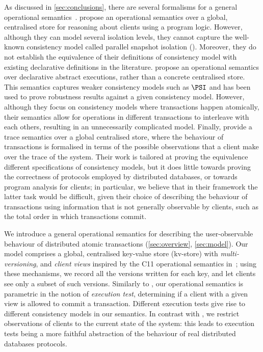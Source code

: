 As discussed in \cref{sec:conclusions}, there are several formalisms for a general operational semantics~\cite{sureshConcur,alonetogether,seebelieve}. 
\citeauthor{alonetogether} \cite{alonetogether} propose an operational
semantics over a global, centralised store  for reasoning about clients using a program logic. 
However, although they can model several isolation levels, they cannot
capture the well-known consistency model called 
parallel snapshot isolation (\PSI). 
Moreover, they do not establish the equivalence of their definitions
of consistency model
with existing declarative definitions in the literature. 
\citeauthor{sureshConcur} \cite{sureshConcur} propose an operational semantics over declarative abstract executions, rather than a concrete centralised store. This semantics captures weaker consistency models
such as \(\PSI\) and has been used to prove robustness results against
a given consistency model. However, although they focus on consistency models where transactions 
happen atomically, their semantics allow for operations in different transactions to interleave with each others, 
resulting in an unnecessarily complicated model.
Finally, \citeauthor{seebelieve} \cite{seebelieve} provide a trace semantics over a global
centralised store, where the behaviour of transactions is formalised in terms of the possible 
observations that a client make over the trace of the system. 
Their work is tailored at proving the equivalence different specifications of consistency models, 
but it does little towards proving the correctness of protocols employed by distributed databases, or 
towards program analysis for clients; in particular, we believe that in their framework the latter task would be 
difficult, given their choice of describing the behaviour of transactions using information that is not generally 
observable by clients, such as the total order in which transactions commit.

We introduce a general operational semantics for describing the
user-observable behaviour of distributed {atomic} transactions
(\cref{sec:overview}, \cref{sec:model}). 
Our model comprises a global, centralised
key-value store (kv-store) with {\em multi-versioning},  and
{\em client views}
inspired by the C11 operational semantics
in~\cite{promises}; 
using these mechanisms,
we record all the versions written for each key, and  let clients see only a subset 
of such versions.
Similarly to \cite{seebelieve}, our  operational semantics  is parametric in the notion of {\em
  execution test},  determining if a client with a given view is
allowed to commit a transaction. 
Different execution tests give rise
to different consistency models in our semantics. In contrast with \cite{seebelieve}, 
we restrict observations of clients  to the current state of the system: this leads to 
execution tests being a more faithful abstraction of the behaviour of real distributed databases protocols.

